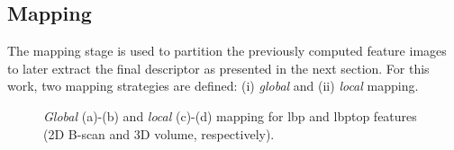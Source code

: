 \begin{table}
\caption{Number of patterns ($LBP_{\#pat}$) for different sampling points and radius ($\{P,R\}$) of the \ac{lbp} descriptor.}
\label{tab:lbphist}
\end{table}

\subsection{Mapping} \label{subsec:mapping}
The mapping stage is used to partition the previously computed feature images to later extract the final descriptor as presented in the next section.
For this work, two mapping strategies are defined: (i) \emph{global} and (ii) \emph{local} mapping.

\begin{figure}[t]
\begin{center}
\hspace*{\fill}
\hfill
{}\hfill
{}\hfill
{}
\hspace*{\fill}
\caption{\emph{Global} (a)-(b) and \emph{local} (c)-(d) mapping for \ac{lbp} and \ac{lbptop} features (2D B-scan and 3D volume, respectively).}
\end{center}
\label{fig:lgmapping}
\end{figure}

